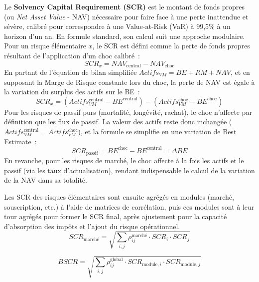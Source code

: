 \bigskip

Le \textbf{Solvency Capital Requirement (SCR)} est le montant de fonds propres (ou \textit{Net Asset Value} - NAV) nécessaire pour faire face à une perte inattendue et sévère, calibré pour correspondre à une Value-at-Risk (VaR) à 99,5\% à un horizon d'un an. En formule standard, son calcul suit une approche modulaire. Pour un risque élémentaire $x$, le SCR est défini comme la perte de fonds propres résultant de l'application d'un choc calibré~:
\begin{equation}
    SCR_{x} = NAV_{\text{central}} - NAV_{\text{choc}}
\end{equation}
En partant de l'équation de bilan simplifiée $Actifs_{VM} = BE + RM + NAV$, et en supposant la Marge de Risque constante lors du choc, la perte de NAV est égale à la variation du surplus des actifs sur le BE~:
\begin{equation*}
    SCR_{x} = (Actifs_{VM}^{\text{central}} - BE^{\text{central}}) - (Actifs_{VM}^{\text{choc}} - BE^{\text{choc}})
\end{equation*}
Pour les risques de passif purs (mortalité, longévité, rachat), le choc n'affecte par définition que les flux de passif. La valeur des actifs reste donc inchangée ($Actifs_{VM}^{\text{central}} = Actifs_{VM}^{\text{choc}}$), et la formule se simplifie en une variation de Best Estimate~:
\begin{equation*}
    SCR_{\text{passif}} = BE^{\text{choc}} - BE^{\text{central}} = \Delta BE
\end{equation*}
En revanche, pour les risques de marché, le choc affecte à la fois les actifs et le passif (via les taux d'actualisation), rendant indispensable le calcul de la variation de la NAV dans sa totalité.

\bigskip

Les SCR des risques élémentaires sont ensuite agrégés en modules (marché, souscription, etc.) à l'aide de matrices de corrélation, puis ces modules sont à leur tour agrégés pour former le SCR final, après ajustement pour la capacité d'absorption des impôts et l'ajout du risque opérationnel.
\begin{equation}
    SCR_{\text{marché}} = \sqrt{\sum_{i,j} \rho_{ij}^{\text{marché}} \cdot SCR_i \cdot SCR_j}
\end{equation}

\bigskip

\begin{equation}
    BSCR = \sqrt{\sum_{i,j} \rho_{ij}^{\text{global}} \cdot SCR_{\text{module}, i} \cdot SCR_{\text{module}, j}}
\end{equation}

